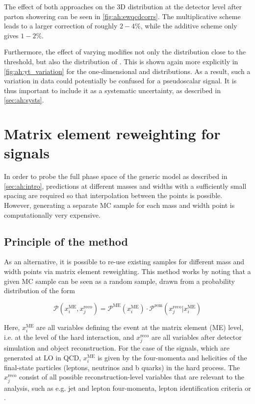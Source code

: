 The effect of both approaches on the 3D \mttchelchan distribution at the detector level after parton showering can be seen in \cref{fig:ah:ewqcdcorrs}. The multiplicative scheme leads to a larger correction of roughly $2-4\%$, while the additive scheme only gives $1-2\%$. 

Furthermore, the effect of varying \yt modifies not only the \mtt distribution close to the \ttbar threshold, but also the distribution of \chel. This is shown again more explicitly in \cref{fig:ah:yt_variation} for the one-dimensional \mtt and \chel distributions. As a result, such a variation in data could potentially be confused for a pseudoscalar signal. It is thus important to include it as a systematic uncertainty, as described in \cref{sec:ah:systs}.


\section{Matrix element reweighting for \AH signals}
\label{sec:ah:mereweighting}

In order to probe the full phase space of the generic \AH model as described in \cref{sec:ah:intro}, predictions at different \AH masses and widths with a sufficiently small spacing are required so that interpolation between the points is possible. However, generating a separate MC sample for each mass and width point is computationally very expensive.

\subsection{Principle of the method}

As an alternative, it is possible to re-use existing samples for different mass and width points via matrix element reweighting. This method works by noting that a given MC sample can be seen as a random sample, drawn from a probability distribution of the form

\begin{equation}
\label{eq:ah:merewprob}
    \mathcal{P}(x_i^{\mathrm{ME}}, x_j^{\mathrm{reco}}) = \mathcal{P}^{\mathrm{ME}} (x_i^{\mathrm{ME}}) \cdot \mathcal{P}^{\mathrm{rem}} (x_j^{\mathrm{reco}} | x_i^{\mathrm{ME}})
\end{equation}

Here, $x_i^{\mathrm{ME}}$ are all variables defining the event at the matrix element (ME) level, i.e. at the level of the hard interaction, and $x_j^{\mathrm{reco}}$ are all variables after detector simulation and object reconstruction. For the case of the \AH signals, which are generated at LO in QCD, $x_i^{\mathrm{ME}}$ is given by the four-momenta and helicities of the final-state particles (leptons, neutrinos and b quarks) in the hard process. The $x_j^{\mathrm{reco}}$ consist of all possible reconstruction-level variables that are relevant to the analysis, such as e.g. jet and lepton four-momenta, lepton identification criteria or \ptmissvec. 

